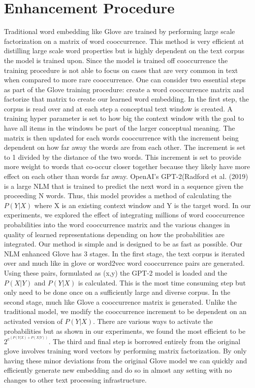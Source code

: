 \documentclass[11pt]{article}
\begin{document}
\section{Enhancement Procedure}
Traditional word embedding like Glove are trained by performing large scale factorization on a matrix of word cooccurrence. This method is very efficient at distilling large scale word properties but is highly dependent on the text corpus the model is trained upon. Since the model is trained off cooccurrence the training procedure is not able to focus on cases that are very common in text when compared to more rare cooccurrence. One can consider two essential steps as part of the Glove training procedure: create a word cooccurrence matrix and factorize that matrix to create our learned word embedding. In the first step, the corpus is read over and at each step a conceptual text window is created. A training hyper parameter is set to how big the context window with the goal to have all items in the windows be part of the larger conceptual meaning. The matrix is then updated for each words cooccurrence with the increment being dependent on how far away the words are from each other. The increment is set to 1 divided by the distance of the two words. This increment is set to provide more weight to words that co-occur closer together because they likely have more effect on each other than words far away. OpenAI's GPT-2(Radford et al. (2019) is a large NLM that is trained to predict the next word in a sequence given the proceeding N words. Thus, this model provides a method of calculating the $P(Y|X)$ where X is an existing context window and Y is the target word. 
In our experiments, we explored the effect of integrating millions of word cooccurrence probabilities into the word cooccurrence matrix and the various changes in quality of learned representations depending on how the probabilities are integrated. Our method is simple and is designed to be as fast as possible. Our NLM enhanced Glove has 3 stages. In the first stage, the text corpus is iterated over and much like in glove or word2vec word cooccurrence pairs are generated. Using these pairs, formulated as (x,y) the GPT-2 model is loaded and the $P(X|Y)$ and $P(Y|X)$ is calculated. This is the most time consuming step but only need to be done once on a sufficiently large and diverse corpus. In the second stage, much like  Glove a cooccurrence matrix is generated. Unlike the traditional model, we modify the cooccurrence increment to be dependent on an activated version of $P(Y|X)$. There are various ways to activate the probabilities but as shown in our experiments, we found the most efficient to be $2^{e^{(P(Y|X)+P(X|Y))}}$. The third and final step is borrowed entirely from the original glove involves training word vectors by performing matrix factorization. By only having these minor deviations from the original Glove model we can quickly and efficiently generate new embedding and do so in almost any setting with no changes to other text processing infrastructure.
\end{document}

